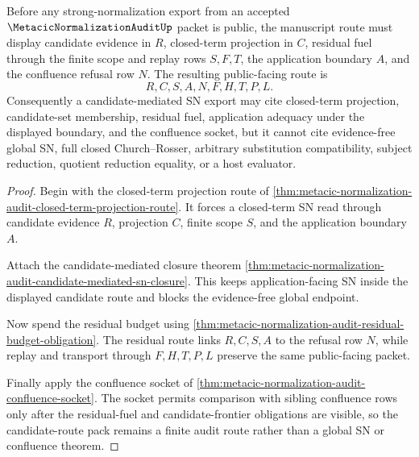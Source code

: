 \begin{theorem}
\label{thm:metacic-normalization-audit-candidate-route-pack}
Before any strong-normalization export from an accepted $\MetacicNormalizationAuditUp$ packet is public, the manuscript route must display candidate evidence in $R$, closed-term projection in $C$, residual fuel through the finite scope and replay rows $S,F,T$, the application boundary $A$, and the confluence refusal row $N$. The resulting public-facing route is
$$
R,C,S,A,N,F,H,T,P,L .
$$
Consequently a candidate-mediated SN export may cite closed-term projection, candidate-set membership, residual fuel, application adequacy under the displayed boundary, and the confluence socket, but it cannot cite evidence-free global SN, full closed Church--Rosser, arbitrary substitution compatibility, subject reduction, quotient reduction equality, or a host evaluator.
\end{theorem}
\begin{proof}
Begin with the closed-term projection route of \autoref{thm:metacic-normalization-audit-closed-term-projection-route}. It forces a closed-term SN read through candidate evidence $R$, projection $C$, finite scope $S$, and the application boundary $A$.

Attach the candidate-mediated closure theorem \autoref{thm:metacic-normalization-audit-candidate-mediated-sn-closure}. This keeps application-facing SN inside the displayed candidate route and blocks the evidence-free global endpoint.

Now spend the residual budget using \autoref{thm:metacic-normalization-audit-residual-budget-obligation}. The residual route links $R,C,S,A$ to the refusal row $N$, while replay and transport through $F,H,T,P,L$ preserve the same public-facing packet.

Finally apply the confluence socket of \autoref{thm:metacic-normalization-audit-confluence-socket}. The socket permits comparison with sibling confluence rows only after the residual-fuel and candidate-frontier obligations are visible, so the candidate-route pack remains a finite audit route rather than a global SN or confluence theorem.
\end{proof}

